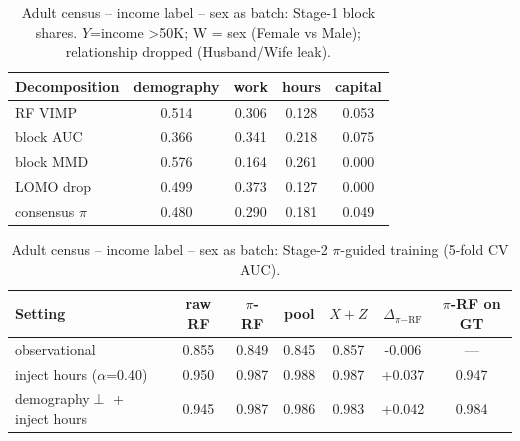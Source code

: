 \begin{table}[t]
\centering
\small
\caption{Adult census  --  income label  --  sex as batch: Stage-1 block shares. $Y$=income >50K; W = sex (Female vs Male); relationship dropped (Husband/Wife leak).}
\begin{tabular}{lcccc}
\toprule
Decomposition & demography & work & hours & capital \\
\midrule
RF VIMP & 0.514 & 0.306 & 0.128 & 0.053 \\
block AUC & 0.366 & 0.341 & 0.218 & 0.075 \\
block MMD & 0.576 & 0.164 & 0.261 & 0.000 \\
LOMO drop & 0.499 & 0.373 & 0.127 & 0.000 \\
consensus $\pi$ & 0.480 & 0.290 & 0.181 & 0.049 \\
\bottomrule
\end{tabular}
\end{table}

\begin{table}[t]
\centering
\small
\caption{Adult census  --  income label  --  sex as batch: Stage-2 $\pi$-guided training (5-fold CV AUC).}
\begin{tabular}{lcccccc}
\toprule
Setting & raw RF & $\pi$-RF & pool & $X{+}Z$ & $\Delta_{\pi\mathrm{-RF}}$ & $\pi$-RF on GT \\
\midrule
observational & 0.855 & 0.849 & 0.845 & 0.857 & -0.006 & --- \\
inject hours ($\alpha$=0.40) & 0.950 & 0.987 & 0.988 & 0.987 & +0.037 & 0.947 \\
demography$\perp$ + inject hours & 0.945 & 0.987 & 0.986 & 0.983 & +0.042 & 0.984 \\
\bottomrule
\end{tabular}
\end{table}

